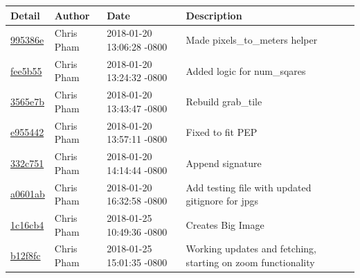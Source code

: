 \begin{center}
\begin{tabular}{l l l l}
\textbf{Detail} & \textbf{Author} & \textbf{Date} &\textbf{Description}\\\hline
\href{https://github.com/OSURoboticsClub/Rover_2017_2018/commit/995386ee89319296165900b1466b6cfc5cf060d5}{995386e} & Chris Pham & 2018-01-20 13:06:28 -0800 &Made pixels\_to\_meters helper\\\hline
\href{https://github.com/OSURoboticsClub/Rover_2017_2018/commit/fee5b5537bbdb496791f7b7f323aae6995844afc}{fee5b55} & Chris Pham & 2018-01-20 13:24:32 -0800 &Added logic for num\_sqares\\\hline
\href{https://github.com/OSURoboticsClub/Rover_2017_2018/commit/3565e7b57f1f19a81b9b34b88a8c9ef527e7c7d6}{3565e7b} & Chris Pham & 2018-01-20 13:43:47 -0800 &Rebuild grab\_tile\\\hline
\href{https://github.com/OSURoboticsClub/Rover_2017_2018/commit/e955442131978ffd1d24aa6ced9ff2c9f899ed59}{e955442} & Chris Pham & 2018-01-20 13:57:11 -0800 &Fixed to fit PEP\\\hline
\href{https://github.com/OSURoboticsClub/Rover_2017_2018/commit/332c751758c837cb52b3a9008ba830c5755fbf76}{332c751} & Chris Pham & 2018-01-20 14:14:44 -0800 &Append signature\\\hline
\href{https://github.com/OSURoboticsClub/Rover_2017_2018/commit/a0601abb8db35bf4a7ebcdba81f702814c73fdf2}{a0601ab} & Chris Pham & 2018-01-20 16:32:58 -0800 &Add testing file with updated gitignore for jpgs\\\hline
\href{https://github.com/OSURoboticsClub/Rover_2017_2018/commit/1c16cb48a1faec2e8dc157748d0f870d1253fde7}{1c16cb4} & Chris Pham & 2018-01-25 10:49:36 -0800 &Creates Big Image\\\hline
\href{https://github.com/OSURoboticsClub/Rover_2017_2018/commit/b12f8fc986912d75d018e8da9912eaa1c93b9e4b}{b12f8fc} & Chris Pham & 2018-01-25 15:01:35 -0800 &Working updates and fetching, starting on zoom functionality\\\hline
\end{tabular}
\end{center}
